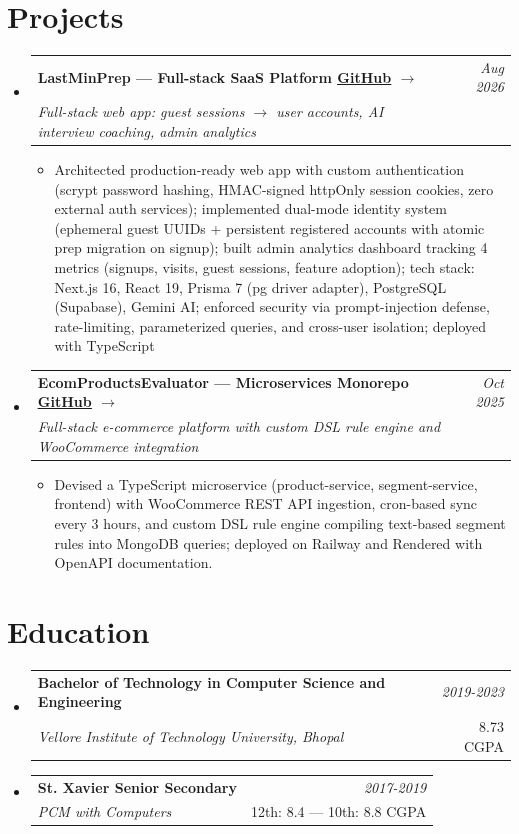 \documentclass[a4paper,11pt]{article}
\makeatletter
\newcommand{\resumeSubheading}[4]{
\vspace{0.5mm}\item
    \begin{tabular*}{0.98\textwidth}[t]{l@{\extracolsep{\fill}}r}
        \textbf{#1} & \textit{\footnotesize{#4}} \\
        \textit{\footnotesize{#3}} &  \footnotesize{#2}\\
    \end{tabular*}
    \vspace{-2.4mm}
}
\newcommand{\resumeProject}[4]{
\vspace{0.5mm}\item
    \begin{tabular*}{0.98\textwidth}[t]{l@{\extracolsep{\fill}}r}
        \textbf{#1} & \textit{\footnotesize{#3}} \\
        \footnotesize{\textit{#2}} & \footnotesize{#4}
    \end{tabular*}
    \vspace{-2.4mm}
}
\newcommand{\resumeSubHeadingListStart}{\begin{itemize}[leftmargin=*,labelsep=0mm]}
\newcommand{\resumeItemListStart}{\begin{justify}\begin{itemize}[leftmargin=3ex, rightmargin=2ex, noitemsep,labelsep=1.2mm,itemsep=0mm]\small}
\newcommand{\resumeSubHeadingListEnd}{\end{itemize}\vspace{2mm}}
\newcommand{\resumeItemListEnd}{\end{itemize}\end{justify}\vspace{-2mm}}
\makeatother
\begin{document}
\section{\textbf{Projects}}
\resumeSubHeadingListStart  
    \resumeProject
    {LastMinPrep --- Full-stack SaaS Platform \href{https://github.com/priyanshsen19/LastMinPrep}{\underline{GitHub}} {\small $\rightarrow$}}
    {Full-stack web app: guest sessions $\rightarrow$ user accounts, AI interview coaching, admin analytics}
    {Aug 2026}{}
    \resumeItemListStart
      \item Architected production-ready web app with custom authentication (scrypt password hashing, HMAC-signed httpOnly session cookies, zero external auth services); implemented dual-mode identity system (ephemeral guest UUIDs + persistent registered accounts with atomic prep migration on signup); built admin analytics dashboard tracking 4 metrics (signups, visits, guest sessions, feature adoption); tech stack: Next.js 16, React 19, Prisma 7 (pg driver adapter), PostgreSQL (Supabase), Gemini AI; enforced security via prompt-injection defense, rate-limiting, parameterized queries, and cross-user isolation; deployed with TypeScript
    \resumeItemListEnd

  \resumeProject
    {EcomProductsEvaluator --- Microservices Monorepo \href{https://github.com/priyanshsen19/EcomProductsEvaluator}{\underline{GitHub}} {\small $\rightarrow$}}
    {Full-stack e-commerce platform with custom DSL rule engine and WooCommerce integration}
    {Oct 2025}{}
    \resumeItemListStart
      \item Devised a TypeScript microservice (product-service, segment-service, frontend) with WooCommerce REST API ingestion, cron-based sync every 3 hours, and custom DSL rule engine compiling text-based segment rules into MongoDB queries; deployed on Railway and Rendered with OpenAPI documentation.
    \resumeItemListEnd

\vspace{-2mm}
\resumeSubHeadingListEnd
\vspace{-6.5mm}




\section{\textbf{Education}}
\resumeSubHeadingListStart
    \resumeSubheading
    {Bachelor of Technology in Computer Science and Engineering}{8.73 CGPA}
    {Vellore Institute of Technology University, Bhopal}{2019-2023}
    \resumeSubheading
    {St. Xavier Senior Secondary}{12th: 8.4 — 10th: 8.8 CGPA}
    {PCM with Computers}{2017-2019}
\resumeSubHeadingListEnd
\vspace{-5.5mm}
\end{document}
